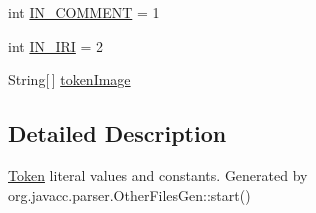 \begin{DoxyCompactItemize}
\item 
int \hyperlink{interfacede_1_1uulm_1_1ecs_1_1ai_1_1owlapi_1_1krssparser_1_1_k_r_s_s2_parser_constants_aaeddf2fce164c1faa3c4c6a2c700e480}{I\-N\-\_\-\-C\-O\-M\-M\-E\-N\-T} = 1
\item 
int \hyperlink{interfacede_1_1uulm_1_1ecs_1_1ai_1_1owlapi_1_1krssparser_1_1_k_r_s_s2_parser_constants_aaf531d86a70894fab44ae94f3638a006}{I\-N\-\_\-\-I\-R\-I} = 2
\item 
String\mbox{[}$\,$\mbox{]} \hyperlink{interfacede_1_1uulm_1_1ecs_1_1ai_1_1owlapi_1_1krssparser_1_1_k_r_s_s2_parser_constants_ae0cb04ffba7bdd9db190157a6cc4fbfb}{token\-Image}
\end{DoxyCompactItemize}


\subsection{Detailed Description}
\hyperlink{classde_1_1uulm_1_1ecs_1_1ai_1_1owlapi_1_1krssparser_1_1_token}{Token} literal values and constants. Generated by org.\-javacc.\-parser.\-Other\-Files\-Gen\-::start() 

